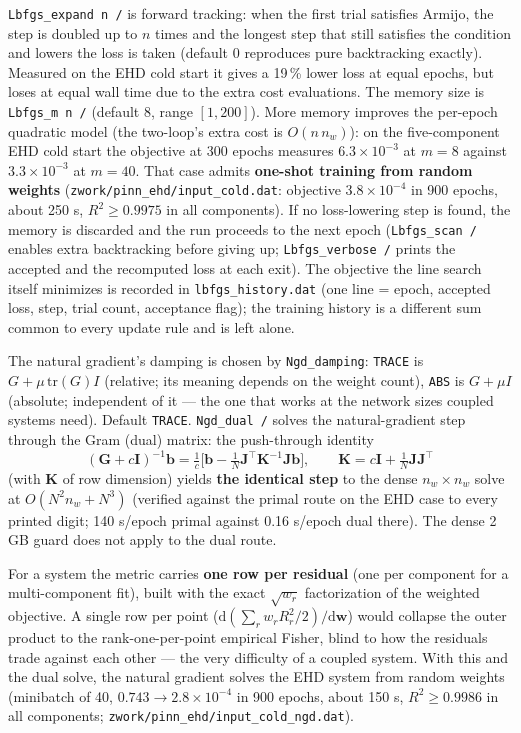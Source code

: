 \documentclass[10pt,a4paper]{article}
\newcommand{\code}[1]{\texttt{#1}}
\newcommand{\mi}[1]{\boldsymbol{#1}}
\begin{document}
\code{Lbfgs\_expand n /} is forward tracking: when the first trial
satisfies Armijo, the step is doubled up to $n$ times and the longest
step that still satisfies the condition and lowers the loss is taken
(default 0 reproduces pure backtracking exactly). Measured on the
EHD cold start it gives a 19\,\% lower loss at equal epochs, but
loses at equal wall time due to the extra cost evaluations. The
memory size is \code{Lbfgs\_m n /} (default 8, range $[1,200]$).
More memory improves the per-epoch quadratic model (the two-loop's
extra cost is $O(n\,n_w)$): on the five-component EHD cold start the
objective at 300 epochs measures $6.3\times10^{-3}$ at $m{=}8$
against $3.3\times10^{-3}$ at $m{=}40$. That case admits
\textbf{one-shot training from random weights}
(\code{zwork/pinn\_ehd/input\_cold.dat}: objective
$3.8\times10^{-4}$ in 900 epochs, about 250 s, $R^2 \ge 0.9975$ in
all components). If no loss-lowering step is found, the memory is
discarded and the run proceeds to the next epoch (\code{Lbfgs\_scan /}
enables extra backtracking before giving up; \code{Lbfgs\_verbose /}
prints the accepted and the recomputed loss at each exit). The
objective the line search itself minimizes is recorded in
\code{lbfgs\_history.dat} (one line = epoch, accepted loss, step,
trial count, acceptance flag); the training history is a different
sum common to every update rule and is left alone.

The natural gradient's damping is chosen by \code{Ngd\_damping}:
\code{TRACE} is $G+\mu\,\mathrm{tr}(G)I$ (relative; its meaning
depends on the weight count), \code{ABS} is $G+\mu I$ (absolute;
independent of it --- the one that works at the network sizes coupled
systems need). Default \code{TRACE}.
\code{Ngd\_dual /} solves the natural-gradient step through the Gram
(dual) matrix: the push-through identity
\[ (\mi{G}+c\mi{I})^{-1}\mi{b}
   = \tfrac{1}{c}\bigl[\mi{b}
   - \tfrac{1}{N}\mi{J}^{\top}\mi{K}^{-1}\mi{J}\mi{b}\bigr],
   \qquad \mi{K}=c\mi{I}+\tfrac{1}{N}\mi{J}\mi{J}^{\top} \]
(with $\mi{K}$ of row dimension) yields \textbf{the identical step}
to the dense $n_w\times n_w$ solve at $O(N^2 n_w + N^3)$ (verified
against the primal route on the EHD case to every printed digit;
140 s/epoch primal against 0.16 s/epoch dual there). The dense 2\,GB
guard does not apply to the dual route.

For a system the metric carries \textbf{one row per residual} (one
per component for a multi-component fit), built with the exact
$\sqrt{w_r}$ factorization of the weighted objective. A single row
per point ($\mathrm{d}(\sum_r w_r R_r^2/2)/\mathrm{d}\mi{w}$) would
collapse the outer product to the rank-one-per-point empirical
Fisher, blind to how the residuals trade against each other --- the
very difficulty of a coupled system. With this and the dual solve,
the natural gradient solves the EHD system from random weights
(minibatch of 40, $0.743\to2.8\times10^{-4}$ in 900 epochs, about
150 s, $R^2\ge0.9986$ in all components;
\code{zwork/pinn\_ehd/input\_cold\_ngd.dat}).
\end{document}
